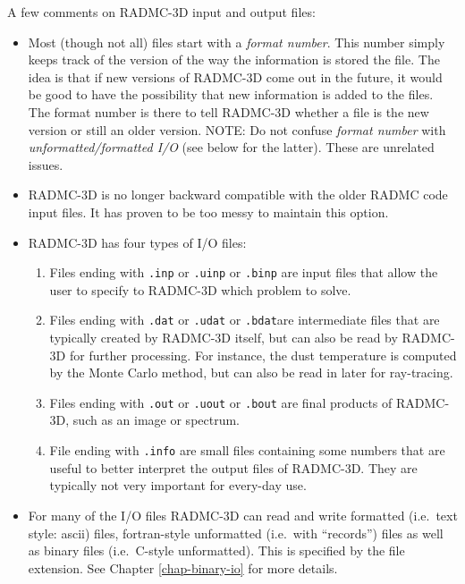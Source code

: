 \documentclass{report}
\begin{document}
A few comments on RADMC-3D input and output files:
\begin{itemize}
\item Most (though not all) files start with a {\em format number}. This
  number simply keeps track of the version of the way the information is
  stored the file. The idea is that if new versions of RADMC-3D come out in
  the future, it would be good to have the possibility that new information
  is added to the files. The format number is there to tell RADMC-3D whether
  a file is the new version or still an older version. NOTE: Do not confuse
  {\em format number} with {\em unformatted/formatted I/O} (see below for
  the latter). These are unrelated issues.
\item RADMC-3D is no longer backward compatible with the older RADMC code
  input files. It has proven to be too messy to maintain this option.
\item RADMC-3D has four types of I/O files:
  \begin{enumerate}
  \item Files ending with {\small\tt .inp} or {\small\tt .uinp} or
    {\small\tt .binp} are input files that allow the user to specify to
    RADMC-3D which problem to solve.
  \item Files ending with {\small\tt .dat} or {\small\tt .udat} or
    {\small\tt .bdat}are intermediate files that are typically created by
    RADMC-3D itself, but can also be read by RADMC-3D for further
    processing. For instance, the dust temperature is computed by the Monte
    Carlo method, but can also be read in later for ray-tracing.
  \item Files ending with {\small\tt .out} or {\small\tt .uout} or
    {\small\tt .bout} are final products of RADMC-3D, such as an image or
    spectrum.
  \item File ending with {\small\tt .info} are small files containing some
    numbers that are useful to better interpret the output files of
    RADMC-3D. They are typically not very important for every-day use.
  \end{enumerate}
\item For many of the I/O files RADMC-3D can read and write formatted
  (i.e.~text style: ascii) files, fortran-style unformatted (i.e.~with
  ``records'') files as well as binary files (i.e.~C-style
  unformatted). This is specified by the file extension. See
  Chapter \ref{chap-binary-io} for more details.
\end{itemize}
\end{document}
